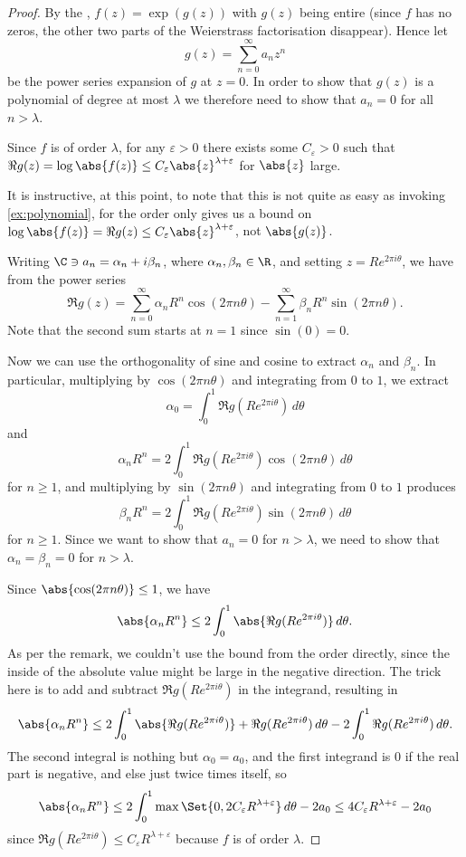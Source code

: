 \begin{proof}
	By the , $f(z) = \exp(g(z))$ with $g(z)$ being entire (since $f$ has no zeros, the other two parts of the Weierstrass factorisation disappear).
	Hence let
	\[
		g(z) = \sum_{n = 0}^\infty a_n z^n
	\]
	be the power series expansion of $g$ at $z = 0$.
	In order to show that $g(z)$ is a polynomial of degree at most $\lambda$ we therefore need to show that $a_n = 0$ for all $n > \lambda$.

	Since $f$ is of order $\lambda$, for any $\varepsilon > 0$ there exists some $C_\varepsilon > 0$ such that $\Re g(z) = \log \abs{f(z)} \leq C_\varepsilon \abs{z}^{\lambda + \varepsilon}$ for $\abs{z}$ large.

	\begin{remark}
		It is instructive, at this point, to note that this is not quite as easy as invoking \autoref{ex:polynomial}, for the order only gives us a bound on $\log \abs{f(z)} = \Re g(z) \leq C_\varepsilon \abs{z}^{\lambda + \varepsilon}$, not $\abs{g(z)}$.
	\end{remark}

	Writing $\C \ni a_n = \alpha_n + i \beta_n$, where $\alpha_n, \beta_n \in \R$, and setting $z = R e^{2 \pi i \theta}$, we have from the power series
	\[
		\Re g(z) = \sum_{n = 0}^\infty \alpha_n R^n \cos(2 \pi n \theta) - \sum_{n = 1}^\infty \beta_n R^n \sin(2 \pi n \theta).
	\]
	Note that the second sum starts at $n = 1$ since $\sin(0) = 0$.

	Now we can use the orthogonality of sine and cosine to extract $\alpha_n$ and $\beta_n$.
	In particular, multiplying by $\cos(2 \pi n \theta)$ and integrating from $0$ to $1$, we extract
	\[
		\alpha_0 = \int_0^1 \Re g(R e^{2 \pi i \theta}) \, d \theta
	\]
	and
	\[
		\alpha_n R^n = 2 \int_0^1 \Re g(R e^{2 \pi i \theta}) \cos(2 \pi n \theta) \, d \theta
	\]
	for $n \geq 1$, and multiplying by $\sin(2 \pi n \theta)$ and integrating from $0$ to $1$ produces
	\[
		\beta_n R^n = 2 \int_0^1 \Re g(R e^{2 \pi i \theta}) \sin(2 \pi n \theta) \, d \theta
	\]
	for $n \geq 1$.
	Since we want to show that $a_n = 0$ for $n > \lambda$, we need to show that $\alpha_n = \beta_n = 0$ for $n > \lambda$.

	Since $\abs{\cos(2 \pi n \theta)} \leq 1$, we have
	\[
		\abs{\alpha_n R^n} \leq 2 \int_0^1 \abs{\Re g(R e^{2 \pi i \theta})} \, d \theta.
	\]
	As per the remark, we couldn't use the bound from the order directly, since the inside of the absolute value might be large in the negative direction.
	The trick here is to add and subtract $\Re g(R e^{2 \pi i \theta})$ in the integrand, resulting in
	\[
		\abs{\alpha_n R^n} \leq 2 \int_0^1 \abs{\Re g(R e^{2 \pi i \theta})} + \Re g(R e^{2 \pi i \theta}) \, d \theta - 2 \int_0^1 \Re g(R e^{2 \pi i \theta}) \, d \theta.
	\]
	The second integral is nothing but $\alpha_0 = a_0$, and the first integrand is $0$ if the real part is negative, and else just twice times itself, so
	\[
		\abs{\alpha_n R^n} \leq 2 \int_0^1 \max\Set{0, 2 C_\varepsilon R^{\lambda + \varepsilon}} \, d \theta - 2 a_0 \leq 4 C_\varepsilon R^{\lambda + \varepsilon} - 2 a_0
	\]
	since $\Re g(R e^{2 \pi i \theta}) \leq C_\varepsilon R^{\lambda + \varepsilon}$ because $f$ is of order $\lambda$.


\end{proof}

